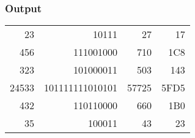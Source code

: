 \documentclass[11pt]{article}
\begin{document}
\subsubsection*{Output}
\label{sec-3-7-2}
\begin{center}
\begin{tabular}{rrrr}
23 & 10111 & 27 & 17\\
456 & 111001000 & 710 & 1C8\\
323 & 101000011 & 503 & 143\\
24533 & 101111111010101 & 57725 & 5FD5\\
432 & 110110000 & 660 & 1B0\\
35 & 100011 & 43 & 23\\
\end{tabular}
\end{center}
\end{document}
